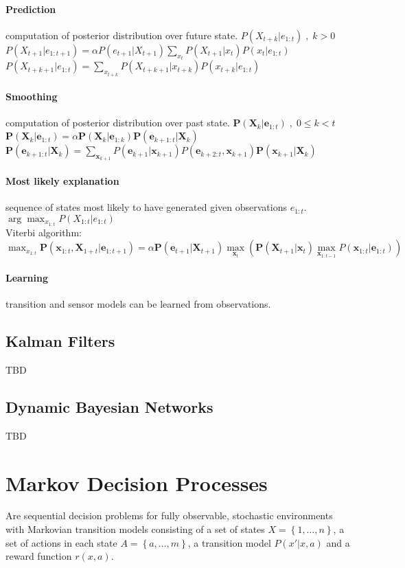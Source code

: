 \begin{multicols}{4}
\paragraph{Prediction} computation of posterior distribution over future state. $P(X_{t+k}|e_{1:t}) \; , \; k>0$ \\
$P(X_{t+1}|e_{1:t+1}) = \alpha P(e_{t+1}|X_{t+1}) \sum\limits_{x_t}P(X_{t+1}|x_t)P(x_t|e_{1:t})$ \\
$P(X_{t+k+1}|e_{1:t}) = \sum\limits_{x_{t+k}}P(X_{t+k+1}|x_{t+k})P(x_{t+k}|e_{1:t})$
\paragraph{Smoothing} computation of posterior distribution over past state. $\bm{P}(\bm{X}_k|\bm{e}_{1:t}) \; , \; 0 \leq k < t$ \\
$\bm{P}(\bm{X}_k|\bm{e}_{1:t}) = \alpha \bm{P}(\bm{X}_k|\bm{e}_{1:k})\bm{P}(\bm{e}_{k+1:t}|\bm{X}_k)$ \\
$\bm{P}(\bm{e}_{k+1:t}|\bm{X}_k) = \sum\limits_{\bm{x}_{k+1}}P(\bm{e}_{k+1}|\bm{x}_{k+1})P(\bm{e}_{k+2:t},\bm{x}_{k+1})\bm{P}(\bm{x}_{k+1}|\bm{X}_k)$
\paragraph{Most likely explanation} sequence of states most likely to have generated given observations $e_{1:t}$. $\arg\!\max_{x_{1:t}} P(X_{1:t}|e_{1:t})$ \\
Viterbi algorithm: $\max_{x_{1:t}} \bm{P}(\bm{x}_{1:t},\bm{X}_{1+t}|\bm{e}_{1:t+1}) = \alpha \bm{P}(\bm{e}_{t+1}|\bm{X}_{t+1})\max\limits_{\bm{x}_t}\left(\bm{P}(\bm{X}_{t+1}|\bm{x}_t) \max\limits_{\bm{x}_{1:t-1}} P(\bm{x}_{1:t} | \bm{e}_{1:t}) \right)$
\paragraph{Learning} transition and sensor models can be learned from observations.

\subsection{Kalman Filters}
TBD

\subsection{Dynamic Bayesian Networks}

TBD

\section{Markov Decision Processes}
Are sequential decision problems for fully observable, stochastic environments with Markovian transition models consisting of a set of states $X = \left\{1,\dots,n\right\}$, a set of actions in each state $A = \left\{a,\dots,m\right\}$, a transition model $P(x'|x,a)$ and a reward function $r(x,a)$.


\end{multicols}
